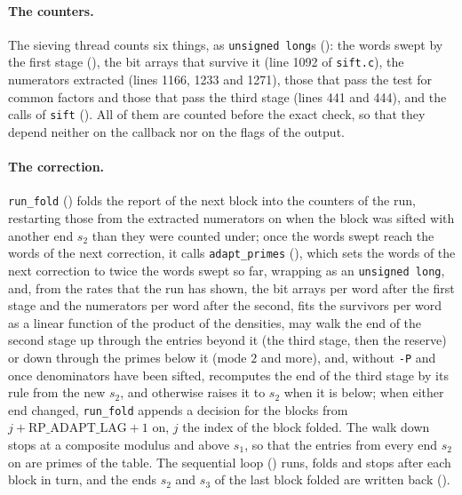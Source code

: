 \paragraph{The counters.} The sieving thread counts six things, as \verb|unsigned long|s
(): the words swept by the first stage (),
the bit arrays that survive it (line 1092 of \verb|sift.c|), the numerators extracted (lines 1166,
1233 and 1271), those that pass the test for common factors and those that pass the third stage
(lines 441 and 444), and the calls of \verb|sift| (). All of them
are counted before the exact check, so that they depend neither on the callback nor on the flags of
the output.

\paragraph{The correction.} \verb|run_fold| () folds the report
of the next block into the counters of the run, restarting those from the extracted numerators on
when the block was sifted with another end $s_2$ than they were counted under; once the words swept
reach the words of the next correction, it calls \verb|adapt_primes|
(), which sets the words of the next correction to twice the
words swept so far, wrapping as an \verb|unsigned long|, and, from the rates that the run has shown,
the bit arrays per word after the first stage and the numerators per word after the second, fits the
survivors per word as a linear function of the product of the densities, may walk the end of the
second stage up through the entries beyond it (the third stage, then the reserve) or down through
the primes below it (mode $2$ and more), and, without \verb|-P| and once denominators have been
sifted, recomputes the end of the third stage by its rule from the new $s_2$, and otherwise raises
it to $s_2$ when it is below; when either end changed, \verb|run_fold| appends a decision for the
blocks from $j + \mathrm{RP\_ADAPT\_LAG} + 1$ on, $j$ the index of the block folded. The walk down
stops at a composite modulus and above $s_1$, so that the entries from every end $s_2$ on are primes
of the table. The sequential loop () runs, folds and stops after
each block in turn, and the ends $s_2$ and $s_3$ of the last block folded are written back
().

